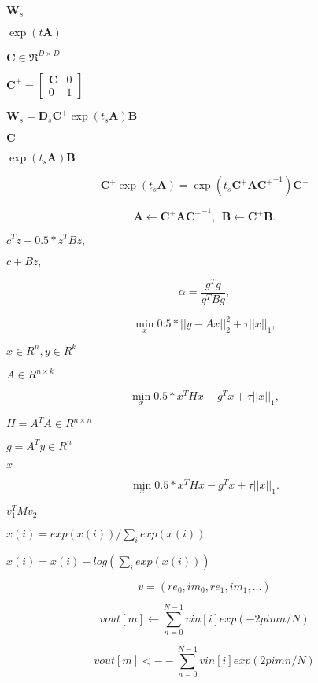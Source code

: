 \documentclass{article}
\begin{document}
$\mathbf{W}_s$
\pagebreak

$\exp(t \mathbf{A})$
\pagebreak

$\mathbf{C} \in \Re^{D\times D}$
\pagebreak

$\mathbf{C}^+ = \left[ \begin{array}{cc} \mathbf{C} & 0 \\ 0 & 1 \end{array} \right]$
\pagebreak

$\mathbf{W}_s = \mathbf{D}_s \mathbf{C}^+ \exp ( t_s \mathbf{A} ) \mathbf{B}$
\pagebreak

$\mathbf{C}$
\pagebreak

$\exp ( t_s \mathbf{A} ) \mathbf{B}$
\pagebreak

\[ \mathbf{C}^+ \exp ( t_s \mathbf{A} ) = \exp ( t_s \mathbf{C}^+ \mathbf{A} \left.\mathbf{C}^+\right.^{-1} ) \mathbf{C}^+ \]
\pagebreak

\[ \mathbf{A} \leftarrow \mathbf{C}^+ \mathbf{A} \left.\mathbf{C}^+\right.^{-1} , \ \ \mathbf{B} \leftarrow \mathbf{C}^+ \mathbf{B} . \]
\pagebreak

$ c^T z + 0.5 * z^T B z, $
\pagebreak

$ c + B z, $
\pagebreak

\[ \alpha = \frac{g^T g}{g^T B g}, \]
\pagebreak

\[ \min_x 0.5 * ||y - Ax||_2^2 + \tau ||x||_1, \]
\pagebreak

$ x \in R^n, y \in R^k $
\pagebreak

$ A \in R^{n \times k} $
\pagebreak

\[ \min_x 0.5 * x^T H x - g^T x + \tau ||x||_1, \]
\pagebreak

$ H = A^T A \in R^{n \times n} $
\pagebreak

$ g = A^T y \in R^n $
\pagebreak

$ x $
\pagebreak

\[ \min_x 0.5 * x^T H x - g^T x + \tau ||x||_1. \]
\pagebreak

$ v_1^T M v_2 $
\pagebreak

$ x(i) = exp(x(i)) / \sum_i exp(x(i)) $
\pagebreak

$ x(i) = x(i) - log(\sum_i exp(x(i))) $
\pagebreak

\[ v = ( re_0, im_0, re_1, im_1, ... ) \]
\pagebreak

\[ vout[m] \leftarrow \sum_{n = 0}^{N-1} vin[i] exp( -2pi m n / N ) \]
\pagebreak

\[ vout[m] <-- \sum_{n = 0}^{N-1} vin[i] exp( 2pi m n / N ) \]
\pagebreak
\end{document}
